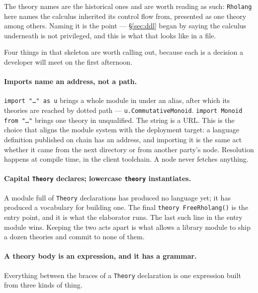 The theory names are the historical ones and are worth reading as such:
\texttt{Rholang} here names the calculus \flang{} inherited its control flow
from, presented as one theory among others. Naming it is the point ---
\S\ref{sec:ddl} began by saying the calculus underneath is not privileged, and
this is what that looks like in a file.

Four things in that skeleton are worth calling out, because each is a decision a
developer will meet on the first afternoon.

\paragraph{Imports name an address, not a path.} \texttt{import "\dots" as u}
brings a whole module in under an alias, after which its theories are reached by
dotted path --- \texttt{u.CommutativeMonoid}. \texttt{import Monoid from "\dots"}
brings one theory in unqualified. The string is a URL. This is the choice that
aligns the module system with the deployment target: a language definition
published on chain has an address, and importing it is the same act whether it
came from the next directory or from another party's node. Resolution happens at
compile time, in the client toolchain. A node never fetches anything.

\paragraph{Capital \texttt{Theory} declares; lowercase \texttt{theory}
instantiates.} A module full of \texttt{Theory} declarations has produced no
language yet; it has produced a vocabulary for building one. The final
\texttt{theory FreeRholang()} is the entry point, and it is what the elaborator
runs. The last such line in the entry module wins. Keeping the two acts apart is
what allows a library module to ship a dozen theories and commit to none of
them.

\paragraph{A theory body is an expression, and it has a grammar.} Everything
between the braces of a \texttt{Theory} declaration is one expression built from
three kinds of thing.

